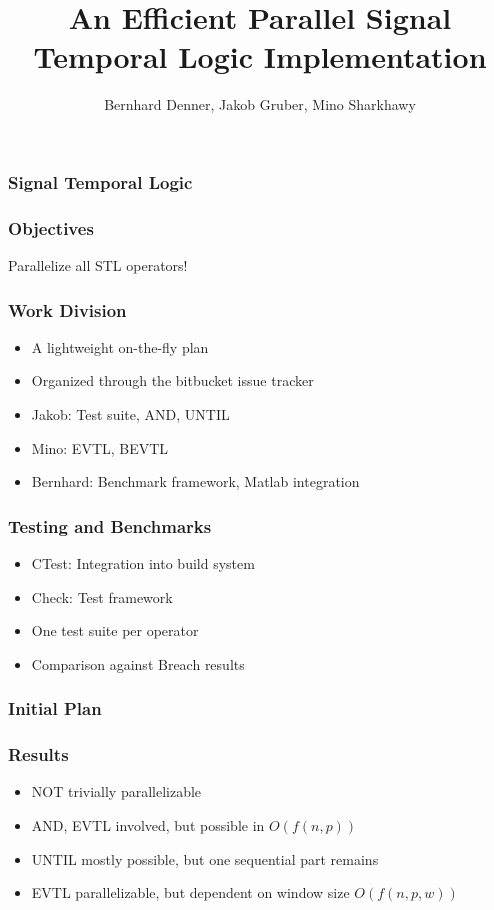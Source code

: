 \documentclass[notes=show]{beamer}
\title{An Efficient Parallel Signal Temporal Logic Implementation}
\author{
	Bernhard Denner,
	Jakob Gruber,
	Mino Sharkhawy
}
\begin{document}
\maketitle

\begin{frame}
\frametitle{Signal Temporal Logic}
\end{frame}

\begin{frame}
\frametitle{Objectives}
Parallelize all STL operators!
\end{frame}

\begin{frame}
\frametitle{Work Division}
\begin{itemize}
\item A lightweight on-the-fly plan
\item Organized through the bitbucket issue tracker
\item Jakob: Test suite, AND, UNTIL
\item Mino: EVTL, BEVTL
\item Bernhard: Benchmark framework, Matlab integration
\end{itemize}
\end{frame}

\begin{frame}
\frametitle{Testing and Benchmarks}
\begin{itemize}
\item CTest: Integration into build system
\item Check: Test framework
\item One test suite per operator
\item Comparison against Breach results
\end{itemize}
\end{frame}

\begin{frame}
\frametitle{Initial Plan}
\end{frame}

\begin{frame}
\frametitle{Results}
\begin{itemize}
\item NOT trivially parallelizable
\item AND, EVTL involved, but possible in $O(f(n,p))$
\item UNTIL mostly possible, but one sequential part remains
\item EVTL parallelizable, but dependent on window size $O(f(n,p,w))$
\end{itemize}
\end{frame}
\end{document}

